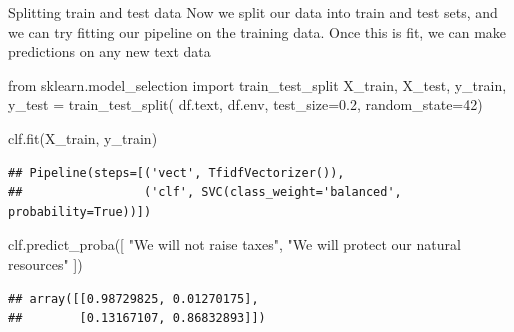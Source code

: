 \documentclass[
  10pt,
  ignorenonframetext,
  aspectratio=169]{beamer}
\newenvironment{Shaded}{\begin{snugshade}}{\end{snugshade}}
\newcommand{\DecValTok}[1]{\textcolor[rgb]{0.86,0.86,0.80}{#1}}
\newcommand{\FloatTok}[1]{\textcolor[rgb]{0.75,0.75,0.82}{#1}}
\newcommand{\ImportTok}[1]{\textcolor[rgb]{0.80,0.80,0.80}{#1}}
\newcommand{\NormalTok}[1]{\textcolor[rgb]{0.80,0.80,0.80}{#1}}
\newcommand{\OperatorTok}[1]{\textcolor[rgb]{0.94,0.94,0.82}{#1}}
\newcommand{\StringTok}[1]{\textcolor[rgb]{0.80,0.58,0.58}{#1}}
\begin{document}
\begin{frame}[fragile]{Splitting train and test data}
\protect\hypertarget{splitting-train-and-test-data}{}
Now we split our data into train and test sets, and we can try fitting
our pipeline on the training data. Once this is fit, we can make
predictions on any new text data

\medskip
\scriptsize

\begin{Shaded}
\begin{Highlighting}[]
\ImportTok{from}\NormalTok{ sklearn.model\_selection }\ImportTok{import}\NormalTok{ train\_test\_split}
\NormalTok{X\_train, X\_test, y\_train, y\_test }\OperatorTok{=}\NormalTok{ train\_test\_split(}
\NormalTok{    df.text, df.env, test\_size}\OperatorTok{=}\FloatTok{0.2}\NormalTok{, random\_state}\OperatorTok{=}\DecValTok{42}\NormalTok{)}

\NormalTok{clf.fit(X\_train, y\_train)}
\end{Highlighting}
\end{Shaded}

\begin{verbatim}
## Pipeline(steps=[('vect', TfidfVectorizer()),
##                 ('clf', SVC(class_weight='balanced', probability=True))])
\end{verbatim}

\begin{Shaded}
\begin{Highlighting}[]
\NormalTok{clf.predict\_proba([}
    \StringTok{"We will not raise taxes"}\NormalTok{,}
    \StringTok{"We will protect our natural resources"}
\NormalTok{])}
\end{Highlighting}
\end{Shaded}

\begin{verbatim}
## array([[0.98729825, 0.01270175],
##        [0.13167107, 0.86832893]])
\end{verbatim}
\end{frame}
\end{document}
